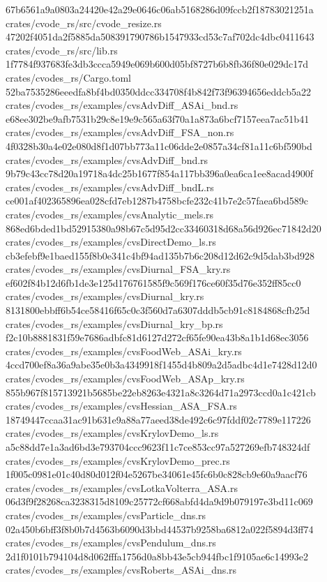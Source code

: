 \documentclass[
  10pt,
]{article}
\newenvironment{Shaded}{}{}
\newcommand{\NormalTok}[1]{#1}
\begin{document}
\begin{Shaded}
\begin{Highlighting}[]
\NormalTok{67b6561a9a0803a24420e42a29e0646c06ab5168286d09fccb2f18783021251a  crates/cvode\_rs/src/cvode\_resize.rs}
\NormalTok{47202f4051da2f5885da508391790786b1547933cd53c7af702dc4dbc0411643  crates/cvode\_rs/src/lib.rs}
\NormalTok{1f7784f937683fe3db3ccca5949e069b600d05bf8727b6b8fb36f80e029dc17d  crates/cvodes\_rs/Cargo.toml}
\NormalTok{52ba7535286eeedfa8bf4bd0350ddcc334708f4b842f73f96394656eddcb5a22  crates/cvodes\_rs/examples/cvsAdvDiff\_ASAi\_bnd.rs}
\NormalTok{e68ee302be9afb7531b29c8e19e9c565a63f70a1a873a6bcf7157eea7ac51b41  crates/cvodes\_rs/examples/cvsAdvDiff\_FSA\_non.rs}
\NormalTok{4f0328b30a4e02e080d8f1d07bb773a11c06dde2e0857a34cf81a11c6bf590bd  crates/cvodes\_rs/examples/cvsAdvDiff\_bnd.rs}
\NormalTok{9b79c43cc78d20a19718a4dc25b1677f854a117bb396a0ea6ca1ee8acad4900f  crates/cvodes\_rs/examples/cvsAdvDiff\_bndL.rs}
\NormalTok{ce001af402365896ea028cfd7eb1287b4758bcfe232c41b7e2c57faea6bd589c  crates/cvodes\_rs/examples/cvsAnalytic\_mels.rs}
\NormalTok{868ed6bded1bd52915380a98b67c5d95d2cc33460318d68a56d926ec71842d20  crates/cvodes\_rs/examples/cvsDirectDemo\_ls.rs}
\NormalTok{cb3efebf9e1baed155f8b0e341c4bf94ad135b7b6c208d12d62c9d5dab3bd928  crates/cvodes\_rs/examples/cvsDiurnal\_FSA\_kry.rs}
\NormalTok{ef602f84b12d6fb1de3e125d176761585f9c569f176ce60f35d76e352ff85cc0  crates/cvodes\_rs/examples/cvsDiurnal\_kry.rs}
\NormalTok{8131800ebbff6b54ce58416f65c0c3f560d7a6307dddb5cb91c8184868cfb25d  crates/cvodes\_rs/examples/cvsDiurnal\_kry\_bp.rs}
\NormalTok{f2c10b8881831f59e7686adbfc81d6127d272cf65fe90ea43b8a1b1d68ec3056  crates/cvodes\_rs/examples/cvsFoodWeb\_ASAi\_kry.rs}
\NormalTok{4ccd700ef8a36a9abe35e0b3a4349918f1455d4b809a2d5adbc4d1e7428d12d0  crates/cvodes\_rs/examples/cvsFoodWeb\_ASAp\_kry.rs}
\NormalTok{855b967f815713921b5685be22eb8263e4321a8c3264d71a2973ccd0a1c421cb  crates/cvodes\_rs/examples/cvsHessian\_ASA\_FSA.rs}
\NormalTok{18749447ccaa31ac91b631e9a88a77aeed38de492c6c97fddf02c7789e117226  crates/cvodes\_rs/examples/cvsKrylovDemo\_ls.rs}
\NormalTok{a5c88dd7e1a3ad6bd3e793704ccc9623f11c7ce853cc97a527269efb748324df  crates/cvodes\_rs/examples/cvsKrylovDemo\_prec.rs}
\NormalTok{1f005c0981e01c40d80d012f04e5267be34061e45fc6b0c828cb9e60a9aacf76  crates/cvodes\_rs/examples/cvsLotkaVolterra\_ASA.rs}
\NormalTok{06d3f9f28268ca3238315d8109c25772cf668abfd4da9d9b079197e3bd11c069  crates/cvodes\_rs/examples/cvsParticle\_dns.rs}
\NormalTok{02a450b6bff3f8b0b7d4563b6090d3bbd44537b9258ba6812a022f5894d3ff74  crates/cvodes\_rs/examples/cvsPendulum\_dns.rs}
\NormalTok{2d1f0101b794104d8d062fffa1756d0a8bb43e5cb944fbc1f9105ae6c14993e2  crates/cvodes\_rs/examples/cvsRoberts\_ASAi\_dns.rs}

\end{Highlighting}
\end{Shaded}
\end{document}
